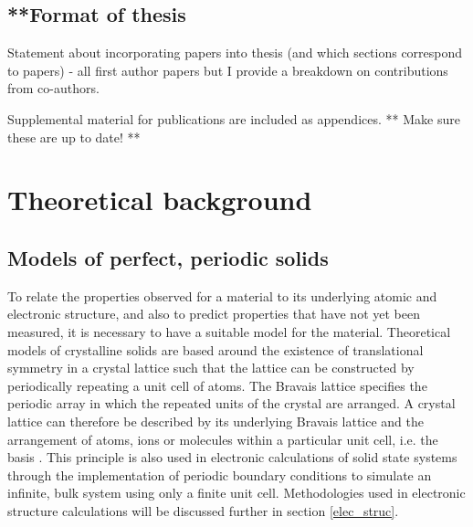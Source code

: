\documentclass[11pt, twoside]{report}
\begin{document}
\section{**Format of thesis}
Statement about incorporating papers into thesis (and which sections correspond to papers) - all first author papers but I provide a breakdown on contributions from co-authors.

Supplemental material for publications are included as appendices. 
** Make sure these are up to date! **

\chapter{Theoretical background} 

\section{Models of perfect, periodic solids}\label{crystal_models}
To relate the properties observed for a material to its underlying atomic and electronic structure, and also to predict properties that have not yet been measured, it is necessary to have a suitable model for the material. Theoretical models of crystalline solids are based around the existence of translational symmetry in a crystal lattice such that the lattice can be constructed by periodically repeating a unit cell of atoms. The Bravais lattice specifies the periodic array in which the repeated units of the crystal are arranged. A crystal lattice can therefore be described by its underlying Bravais lattice and the arrangement of atoms, ions or molecules within a particular unit cell, i.e. the basis \cite{AshcroftMermin2}. This principle is also used in electronic calculations of solid state systems through the implementation of periodic boundary conditions to simulate an infinite, bulk system using only a finite unit cell. Methodologies used in electronic structure calculations will be discussed further in section \ref{elec_struc}.
 
\end{document}
